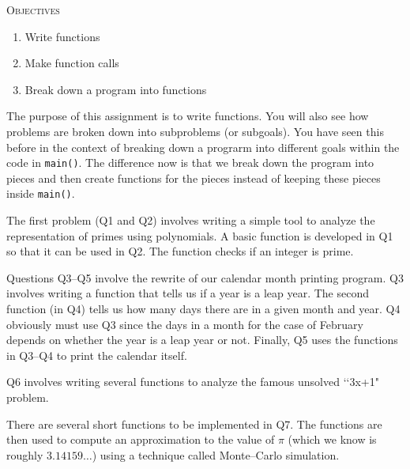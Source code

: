 


\renewcommand\TITLE{Assignment 12}
\usepackage{import}


\topmatter

\textsc{Objectives}
 \begin{enumerate}
   \item Write functions
   \item Make function calls
   \item Break down a program into functions
 \end{enumerate}
\mbox{}

The purpose of this assignment is to write functions. You will also see how
problems are broken down into subproblems (or subgoals). You have seen this
before in the context of breaking down a prograrm into different goals within
the code in \verb!main()!. The difference now is that we break down the
program into pieces and then create functions for the pieces instead of
keeping these pieces inside \verb!main()!.

The first problem (Q1 and Q2) involves writing a simple tool to analyze
the representation of primes using polynomials. A basic function is developed
in Q1 so that it can be used in Q2. The function checks if an integer is
prime.

Questions Q3--Q5 involve the rewrite of our calendar month printing
program. Q3 involves writing a function that tells us if a year is a leap
year. The second function (in Q4) tells us how many days there are in a
given month and year. Q4 obviously must use Q3 since the days in a month
for the case of February depends on whether the year is a leap year or not.
Finally, Q5 uses the functions in Q3--Q4 to print the calendar itself.

Q6 involves writing several functions to analyze the famous unsolved
\lq\lq3x+1" problem.

There are several short functions to be implemented in Q7. The functions are
then used to compute an approximation to the value of $\pi$ (which we know is
roughly $3.14159\ldots$) using a technique called Monte--Carlo simulation.



